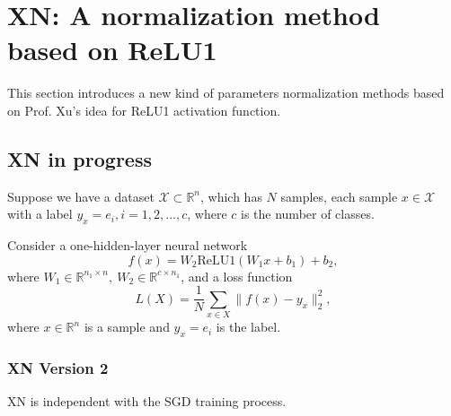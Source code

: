 \section{XN: A normalization method based on ReLU1}
This section introduces a new kind of parameters normalization methods based on Prof. Xu's idea for ReLU1 activation function.

\subsection{XN in progress}
Suppose we have a dataset $\mathcal{X}\subset\mathbb{R}^n$, which has $N$ samples, each sample $x\in \mathcal{X}$ with a label $y_x=e_i,i=1,2,...,c$, where $c$ is the number of classes.

Consider a one-hidden-layer neural network 
\begin{equation}
	\label{1hidden}
	f(x)=W_2\text{ReLU1}(W_1x+b_1)+b_2,  
\end{equation}
where $W_1\in\mathbb{R}^{n_1\times n},\ W_2\in\mathbb{R}^{c\times n_1}$, and a loss function \[L(X)=\frac{1}{N}\sum_{x\in X}\|f(x)-y_x\|^2_2,\] where $x\in\mathbb{R}^n$ is a sample and $y_x=e_i$ is the label. 
%
\subsubsection{XN Version 2}
XN is independent with the SGD training process.

